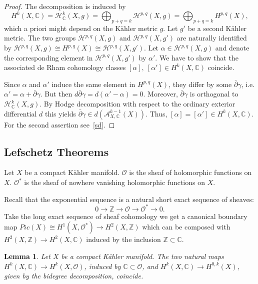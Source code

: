 \documentclass{article}
\theoremstyle{definition}
\theoremstyle{plain}
\newtheorem{lemma}[definition]{Lemma}
\begin{document}
\begin{proof}
    The decomposition is induced by\[
        H^k(X,\mathbb{C})=\mathcal{H}^k_{\mathbb{C}}(X,g)=\bigoplus_{p+q=k}\mathcal{H}^{p,q}(X,g)=\bigoplus_{p+q=k}H^{p,q}(X),
    \]which a priori might depend on the K\"{a}hler metric $ g $. Let $ g' $ be a second K\"{a}hler metric. The two groups $ \mathcal{H}^{p,q}(X,g) $ and $ \mathcal{H}^{p,q}(X,g') $ are naturally identified by $ \mathcal{H}^{p,q}(X,g)\cong H^{p,q}(X)\cong \mathcal{H}^{p,q}(X,g') $. Let $ \alpha\in\mathcal{H}^{p,q}(X,g) $ and denote the corresponding element in $ \mathcal{H}^{p,q}(X,g') $ by $ \alpha' $. We have to show that the associated de Rham cohomology classes $ [\alpha],\ [\alpha']\in H^k(X,\mathbb{C}) $ coincide.

    Since $ \alpha $ and $ \alpha' $ induce the same element in $ H^{p,q}(X) $, they differ by some $ \bar{\partial}\gamma $, i.e. $ \alpha'=\alpha+\bar{\partial}\gamma $. But then $ d\bar{\partial}\gamma=d(\alpha'-\alpha)=0 $. Moreover, $ \bar{\partial}\gamma $ is orthogonal to $ \mathcal{H}^k_{\mathbb{C}}(X,g) $. By Hodge decomposition with respect to the ordinary exterior differential $ d $ this yields $ \bar{\partial}\gamma\in d(\mathcal{A}^{k-1}_{X,\mathbb{C}}(X)) $. Thus, $ [\alpha]=[\alpha']\in H^k(X,\mathbb{C}) $. For the second assertion see~\ref{sd}.
\end{proof}

\subsection{Lefschetz Theorems}

Let $ X $ be a compact K\"{a}hler manifold. $ \mathcal{O} $ is the sheaf of holomorphic functions on $ X $. $ \mathcal{O}^* $ is the sheaf of nowhere vanishing holomorphic functions on $ X $.

Recall that the exponential sequence is a natural short exact sequence of sheaves:\[
    0\longrightarrow \mathbb{Z}\longrightarrow\mathcal{O}\longrightarrow\mathcal{O}^*\longrightarrow 0.
\]Take the long exact sequence of sheaf cohomology we get a canonical boundary map $ Pic(X)\cong H^1(X,\mathcal{O}^*)\rightarrow H^2(X,\mathbb{Z}) $ which can be composed with $ H^2(X,\mathbb{Z})\rightarrow H^2(X,\mathbb{C}) $ induced by the inclusion $ \mathbb{Z}\subset\mathbb{C} $.

\begin{lemma}
    Let $ X $ be a compact K\"{a}hler manifold. The two natural maps $ H^k(X,\mathbb{C})\rightarrow H^k(X,\mathcal{O}) $, induced by $ \mathbb{C}\subset\mathcal{O} $, and $ H^k(X,\mathbb{C})\rightarrow H^{0,k}(X) $, given by the bidegree decomposition, coincide.
\end{lemma}
\end{document}
